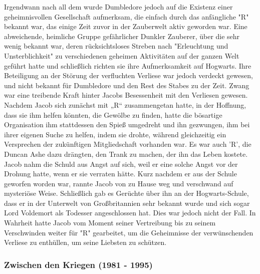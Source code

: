 \documentclass[a4paper, 10pt]{article}
\begin{document}
\vspace{10pt}
\newline
Irgendwann nach all dem wurde Dumbledore jedoch auf die Existenz einer geheimnisvollen Gesellschaft aufmerksam, die einfach durch das anfängliche "R" bekannt war, das einige Zeit zuvor in der Zauberwelt aktiv geworden war. Eine abweichende, heimliche Gruppe gefährlicher Dunkler Zauberer, über die sehr wenig bekannt war, deren rücksichtsloses Streben nach "Erleuchtung und Unsterblichkeit" zu verschiedenen geheimen Aktivitäten auf der ganzen Welt geführt hatte und schließlich richten sie ihre Aufmerksamkeit auf Hogwarts. Ihre Beteiligung an der Störung der verfluchten Verliese war jedoch verdeckt gewesen, und nicht bekannt für Dumbledore und den Rest des Stabes zu der Zeit. Zwang war eine treibende Kraft hinter Jacobs Besessenheit mit den Verliesen gewesen. Nachdem Jacob sich zunächst mit „R“ zusammengetan hatte, in der Hoffnung, dass sie ihm helfen könnten, die Gewölbe zu finden, hatte die bösartige Organisation ihm stattdessen den Spieß umgedreht und ihn gezwungen, ihm bei ihrer eigenen Suche zu helfen, indem sie drohte, während gleichzeitig ein Versprechen der zukünftigen Mitgliedschaft vorhanden war. Es war auch 'R', die Duncan Ashe dazu drängten, den Trank zu machen, der ihn das Leben kostete. Jacob nahm die Schuld aus Angst auf sich, weil er eine solche Angst vor der Drohung hatte, wenn er sie verraten hätte.
\vspace{10pt}
\newline
Kurz nachdem er aus der Schule geworfen worden war, rannte Jacob von zu Hause weg und verschwand auf mysteriöse Weise. Schließlich gab es Gerüchte über ihn an der Hogwarts-Schule, dass er in der Unterwelt von Großbritannien sehr bekannt wurde und sich sogar Lord Voldemort als Todesser angeschlossen hat. Dies war jedoch nicht der Fall. In Wahrheit hatte Jacob vom
Moment seiner Vertreibung bis zu seinem Verschwinden weiter für "R" gearbeitet, um die Geheimnisse der verwünschenden Verliese zu enthüllen, um seine Liebsten zu schützen.

\subsubsection*{\large Zwischen den Kriegen (1981 - 1995)}
\end{document}
